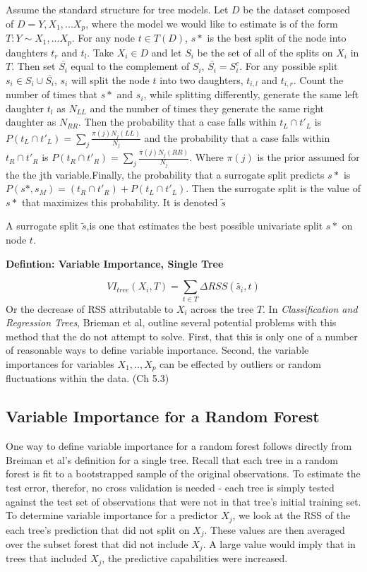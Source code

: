 \documentclass[12pt,twoside]{reedthesis}
\begin{document}
  Assume the standard structure for tree models. Let \(D\) be the dataset
  composed of \(D = {Y, X_1,...X_p}\), where the model we would like to
  estimate is of the form \(T: Y \sim X_1,...X_p\). For any node
  \(t \in T(D)\), \(s*\) is the best split of the node into daughters
  \(t_r\) and \(t_l\). Take \(X_i \in D\) and let \(S_i\) be the set of
  all of the splits on \(X_i\) in \(T\). Then set \(\bar{S_i}\) equal to
  the complement of \(S_i\), \(\bar{S_i} = S_i^c\). For any possible split
  \(s_i \in S_i \cup \bar{S_i}\), \(s_i\) will split the node \(t\) into
  two daughters, \(t_{i,l}\) and \(t_{i,r}\). Count the number of times
  that \(s*\) and \(s_i\), while splitting differently, generate the same
  left daughter \(t_{l}\) as \(N_{LL}\) and the number of times they
  generate the same right daughter as \(N_{RR}\). Then the probability
  that a case falls within \(t_L \cap t'_L\) is
  \(P(t_L \cap t'_L) = \sum_j \frac{\pi(j) N_j(LL)}{N_j}\) and the
  probability that a case falls within \(t_R \cap t'_R\) is
  \(P(t_R \cap t'_R) = \sum_j \frac{\pi(j) N_j(RR)}{N_j}\). Where
  \(\pi(j)\) is the prior assumed for the the jth variable.Finally, the
  probability that a surrogate split predicts \(s*\) is
  \(P(s*, s_M) = (t_R \cap t'_R) + P(t_L \cap t'_L)\). Then the surrogate
  split is the value of \(s*\) that maximizes this probability. It is
  denoted \(\tilde{s}\)
  
  A surrogate split \(\tilde{s}\),is one that estimates the best possible
  univariate split \(s*\) on node \(t\).
  
  \textbf{Defintion: Variable Importance, Single Tree}
  
  \[VI_{tree}(X_i, T) = \sum_{t \in T} \Delta RSS(\tilde{s_i}, t)\] Or the
  decrease of RSS attributable to \(X_i\) across the tree \(T\). In
  \emph{Classification and Regression Trees}, Brieman et al, outline
  several potential problems with this method that the do not attempt to
  solve. First, that this is only one of a number of reasonable ways to
  define variable importance. Second, the variable importances for
  variables \(X_1,..,X_p\) can be effected by outliers or random
  fluctuations within the data. (Ch 5.3)
  
  \subsection{Variable Importance for a Random
  Forest}\label{variable-importance-for-a-random-forest}
  
  One way to define variable importance for a random forest follows
  directly from Breiman et al's definition for a single tree. Recall that
  each tree in a random forest is fit to a bootstrapped sample of the
  original observations. To estimate the test error, therefor, no cross
  validation is needed - each tree is simply tested against the test set
  of observations that were not in that tree's initial training set. To
  determine variable importance for a predictor \(X_j\), we look at the
  RSS of the each tree's prediction that did not split on \(X_j\). These
  values are then averaged over the subset forest that did not include
  \(X_j\). A large value would imply that in trees that included \(X_j\),
  the predictive capabilities were increased.
  
\end{document}
